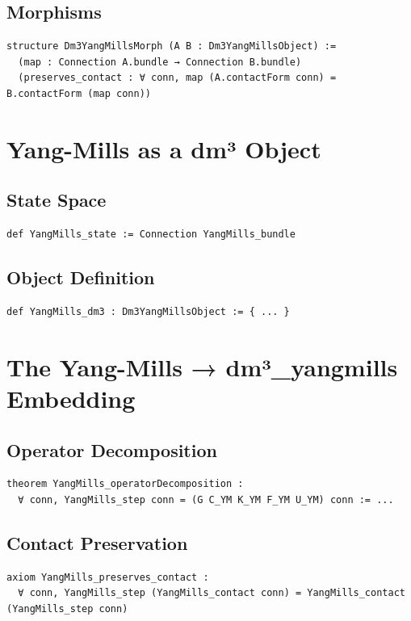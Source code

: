 \documentclass[11pt,a4paper]{article}
\begin{document}
\subsection{Morphisms}
\begin{lstlisting}
structure Dm3YangMillsMorph (A B : Dm3YangMillsObject) :=
  (map : Connection A.bundle → Connection B.bundle)
  (preserves_contact : ∀ conn, map (A.contactForm conn) = B.contactForm (map conn))
\end{lstlisting}

\section{Yang-Mills as a dm³ Object}

\subsection{State Space}
\begin{lstlisting}
def YangMills_state := Connection YangMills_bundle
\end{lstlisting}

\subsection{Object Definition}
\begin{lstlisting}
def YangMills_dm3 : Dm3YangMillsObject := { ... }
\end{lstlisting}

\section{The Yang-Mills → dm³\_yangmills Embedding}

\subsection{Operator Decomposition}
\begin{lstlisting}
theorem YangMills_operatorDecomposition :
  ∀ conn, YangMills_step conn = (G C_YM K_YM F_YM U_YM) conn := ...
\end{lstlisting}

\subsection{Contact Preservation}
\begin{lstlisting}
axiom YangMills_preserves_contact :
  ∀ conn, YangMills_step (YangMills_contact conn) = YangMills_contact (YangMills_step conn)
\end{lstlisting}
\end{document}
